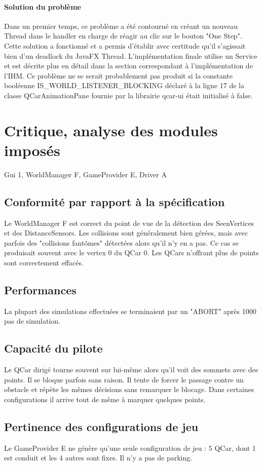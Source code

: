 \documentclass[a4paper, 12pt]{article}
\begin{document}
\paragraph{Solution du problème}
Dans un premier temps, ce problème a été contourné en créant un nouveau Thread dans le handler en charge de réagir au clic sur le bouton "One Step". Cette solution a fonctionné et a permis d'établir avec certitude qu'il s'agissait bien d'un deadlock du JavaFX Thread. L'implémentation finale utilise un Service et est décrite plus en détail dans la section correspondant à l'implémentation de l'IHM. Ce problème ne se serait probablement pas produit si la constante booléenne IS\_WORLD\_LISTENER\_BLOCKING déclaré à la ligne 17 de la classe QCarAnimationPane fournie par la librairie qcar-ui était initialisé à false.
\section{Critique, analyse des modules imposés}
Gui 1, WorldManager F, GameProvider E, Driver A
\subsection{Conformité par rapport à la spécification}
Le WorldManager F est correct du point de vue de la détection des SeenVertices et des DistanceSensors. Les collisions sont généralement bien gérées, mais avec parfois des "collisions fantômes" détectées alors qu'il n'y en a pas. Ce cas se produisait souvent avec le vertex 0 du QCar 0. Les QCars n'offrant plus de points sont correctement effacés. 
\subsection{Performances}
La plupart des simulations effectuées se terminaient par un "ABORT" après 1000 pas de simulation.
\subsection{Capacité du pilote}
Le QCar dirigé tourne souvent sur lui-même alors qu'il voit des sommets avec des points. Il se bloque parfois sans raison. Il tente de forcer le passage contre un obstacle et répète les mêmes décisions sans remarquer le blocage. Dans certaines configurations il arrive tout de même à marquer quelques points.
\subsection{Pertinence des configurations de jeu}
Le GameProvider E ne génère qu'une seule configuration de jeu : 5 QCar, dont 1 est conduit et les 4 autres sont fixes. Il n'y a pas de parking.
\end{document}

